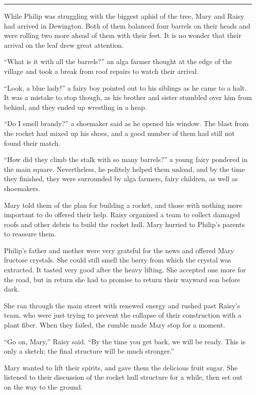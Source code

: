 \documentclass[10pt, draft]{memoir}
\renewcommand{\pfbreakdisplay}{\bigskip \ding{166} \bigskip}
\newcommand{\secbreak}{\fancybreak{\pfbreakdisplay}}
\begin{document}
\secbreak

While Philip was struggling with the biggest aphid of the tree, Mary and Raisy
had arrived in  Dewington. Both of them balanced four barrels on their heads
and were rolling two more ahead of them with their feet. It is no wonder that
their arrival on the leaf drew great attention.

``What is it with all the barrels?'' an alga farmer thought at the edge of the
village and took a break from roof repairs to watch their arrival.

``Look, a blue lady!'' a fairy boy pointed out to his siblings as he came to a
halt. It was a mistake to stop though, as his brother and sister stumbled over
him from behind, and they ended up wrestling in a heap.

``Do I smell brandy?'' a shoemaker said as he opened his window. The blast from
the rocket had mixed up his shoes, and a good number of them had still not
found their match.

``How did they climb the stalk with so many barrels?'' a young fairy pondered
in the main square. Nevertheless, he politely helped them unload, and by the
time they finished, they were surrounded by alga farmers, fairy children, as
well as shoemakers.

Mary told them of the plan for building a rocket, and those with nothing more
important to do offered their help. Raisy organized a team to collect damaged
roofs and other debris to build the rocket hull. Mary hurried to Philip's
parents to reassure them.

Philip's father and mother were very grateful for the news and offered Mary
fructose crystals. She could still smell the berry from which the crystal was
extracted. It tasted very good after the heavy lifting. She accepted one more
for the road, but in return she had to promise to return their wayward son
before dark.

She ran through the main street with renewed energy and rushed past Raisy's
team, who were just trying to prevent the collapse of their construction with a
plant fiber. When they failed, the rumble made Mary stop for a moment.

``Go on, Mary,'' Raisy said. ``By the time you get back, we will be ready. This
is only a sketch; the final structure will be much stronger.''

Mary wanted to lift their spirits, and gave them the delicious fruit sugar. She
listened to their discussion of the rocket hull structure for a while, then set
out on the way to the ground.
\end{document}
